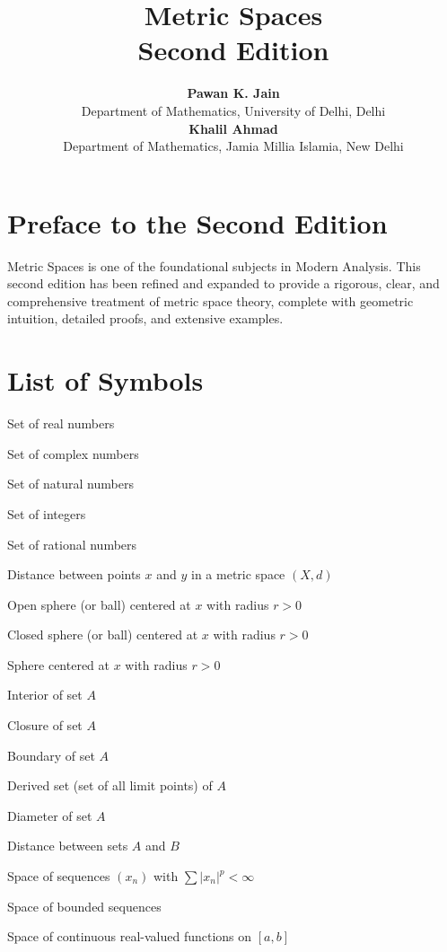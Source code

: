 \documentclass[11pt,a4paper,twoside,openright]{book}
\title{
    \vspace{-2cm}
    \Huge \bfseries Metric Spaces \\[0.5em]
    \large Second Edition
}
\author{
    \Large \textbf{Pawan K. Jain} \\
    \small Department of Mathematics, University of Delhi, Delhi \\[1em]
    \Large \textbf{Khalil Ahmad} \\
    \small Department of Mathematics, Jamia Millia Islamia, New Delhi
}
\date{}
\begin{document}
\frontmatter
\maketitle

\chapter*{Preface to the Second Edition}
Metric Spaces is one of the foundational subjects in Modern Analysis. This second edition has been refined and expanded to provide a rigorous, clear, and comprehensive treatment of metric space theory, complete with geometric intuition, detailed proofs, and extensive examples.

\chapter*{List of Symbols}
\begin{description}[labelwidth=2cm, leftmargin=2.5cm]
\item[$\mathbb{R}$] Set of real numbers
\item[$\mathbb{C}$] Set of complex numbers
\item[$\mathbb{N}$] Set of natural numbers
\item[$\mathbb{Z}$] Set of integers
\item[$\mathbb{Q}$] Set of rational numbers
\item[$d(x,y)$] Distance between points $x$ and $y$ in a metric space $(X,d)$
\item[$B(x,r)$] Open sphere (or ball) centered at $x$ with radius $r > 0$
\item[$\overline{B}(x,r)$] Closed sphere (or ball) centered at $x$ with radius $r > 0$
\item[$S(x,r)$] Sphere centered at $x$ with radius $r > 0$
\item[$\Int(A)$] Interior of set $A$
\item[$\overline{A}$] Closure of set $A$
\item[$\Bd(A)$] Boundary of set $A$
\item[$A'$] Derived set (set of all limit points) of $A$
\item[$\diam(A)$] Diameter of set $A$
\item[$d(A,B)$] Distance between sets $A$ and $B$
\item[$\ell_p$] Space of sequences $(x_n)$ with $\sum |x_n|^p < \infty$
\item[$\ell_\infty$] Space of bounded sequences
\item[{C[a,b]}] Space of continuous real-valued functions on $[a,b]$
\end{description}

\tableofcontents

\mainmatter









\appendix

\end{document}
